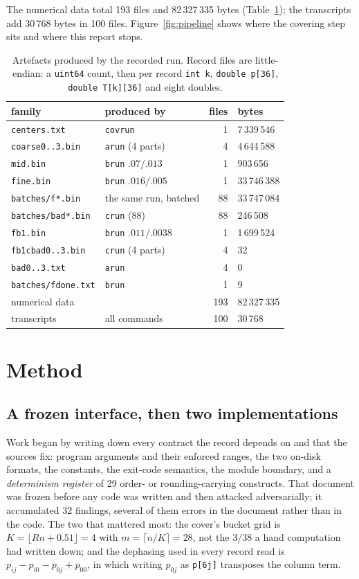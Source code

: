 \documentclass[11pt,a4paper]{article}
\newcommand{\code}[1]{\texttt{\small #1}}
\begin{document}
The numerical data total 193 files and 82\,327\,335 bytes (Table~\ref{tab:artefacts}); the
transcripts add 30\,768 bytes in 100 files. Figure~\ref{fig:pipeline} shows where the covering step
sits and where this report stops.

\begin{table}[t]
\centering\small
\caption{Artefacts produced by the recorded run. Record files are little-endian: a \code{uint64}
count, then per record \code{int k}, \code{double p[36]}, \code{double T[k][36]} and eight doubles.}
\label{tab:artefacts}
\begin{tabular}{llrl}
\toprule
family & produced by & files & bytes \\
\midrule
\code{centers.txt} & \code{covrun} & 1 & 7\,339\,546 \\
\code{coarse0..3.bin} & \code{arun} (4 parts) & 4 & 4\,644\,588 \\
\code{mid.bin} & \code{brun} $.07/.013$ & 1 & 903\,656 \\
\code{fine.bin} & \code{brun} $.016/.005$ & 1 & 33\,746\,388 \\
\code{batches/f*.bin} & the same run, batched & 88 & 33\,747\,084 \\
\code{batches/bad*.bin} & \code{crun} (88) & 88 & 246\,508 \\
\code{fb1.bin} & \code{brun} $.011/.0038$ & 1 & 1\,699\,524 \\
\code{fb1cbad0..3.bin} & \code{crun} (4 parts) & 4 & 32 \\
\code{bad0..3.txt} & \code{arun} & 4 & 0 \\
\code{batches/fdone.txt} & \code{brun} & 1 & 9 \\
\midrule
numerical data & & 193 & 82\,327\,335 \\
transcripts & all commands & 100 & 30\,768 \\
\bottomrule
\end{tabular}
\end{table}

\section{Method}\label{sec:method}

\subsection{A frozen interface, then two implementations}
Work began by writing down every contract the record depends on and that the sources fix: program
arguments and their enforced ranges, the two on-disk formats, the constants, the exit-code semantics,
the module boundary, and a \emph{determinism register} of 29 order- or rounding-carrying constructs.
That document was frozen before any code was written and then attacked adversarially; it accumulated
32 findings, several of them errors in the document rather than in the code. The two that mattered
most: the cover's bucket grid is $K=\lfloor Rn+0.51\rfloor=4$ with $m=\lceil n/K\rceil=28$, not the $3/38$ a hand computation had written
down; and the dephasing used in every record read is $p_{ij}-p_{i0}-p_{0j}+p_{00}$, in which writing
$p_{0j}$ as \code{p[6j]} transposes the column term.
\end{document}
